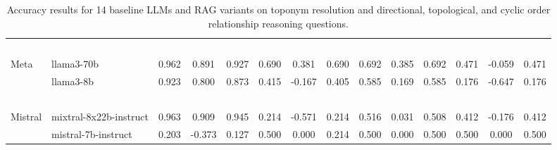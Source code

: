 \begin{table*}[ht]
\begin{tabular}{l|lccc|ccc|ccc|ccc}
        ~       & ~                      & ~ & ~ & ~ & ~    & ~ & ~ & ~ & ~ & ~ & ~ & ~ & ~ \\
        Meta    & llama3-70b             & 0.962 & 0.891 & 0.927 & 0.690   & 0.381 & 0.690 & 0.692 & 0.385 & 0.692 & 0.471 & -0.059 & 0.471\\ %
        ~       & llama3-8b              & 0.923 & 0.800 & 0.873 & 0.415  & -0.167 & 0.405 & 0.585 & 0.169 & 0.585 & 0.176 & -0.647 & 0.176 \\ %
        ~       & ~                      & ~ & ~ & ~ & ~   & ~ & ~ & ~ & ~ & ~ & ~ & ~ & ~ \\
        Mistral & mixtral-8x22b-instruct & 0.963 & 0.909 & 0.945 & 0.214   & -0.571 & 0.214 & 0.516 & 0.031 & 0.508 & 0.412 & -0.176 & 0.412\\ %
        ~       & mistral-7b-instruct    & 0.203 & -0.373 & 0.127 & 0.500  & 0.000 & 0.214 & 0.500 & 0.000 & 0.500 & 0.500 & 0.000 & 0.500 \\ %
    \hline
    \hline
    \end{tabular}
    \caption{Accuracy results for 14 baseline LLMs and  RAG variants on toponym resolution and directional, topological, and cyclic order relationship reasoning questions.}
    \label{tab:models}
\end{table*}